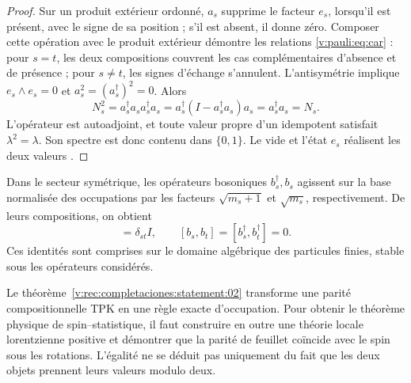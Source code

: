 \begin{proof}
Sur un produit extérieur ordonné, \(a_s\) supprime le facteur \(e_s\), lorsqu’il est
présent, avec le signe de sa position ; s’il est absent, il donne zéro. Composer
cette opération avec le produit extérieur démontre les relations
\eqref{v:pauli:eq:car} : pour \(s=t\), les deux compositions couvrent les cas
complémentaires d’absence et de présence ; pour \(s\ne t\), les signes
d’échange s’annulent. L’antisymétrie implique
\(e_s\wedge e_s=0\) et
\(a_s^2=(a_s^\dagger)^2=0\). Alors
\begin{equation}
 N_s^2=a_s^\dagger a_s a_s^\dagger a_s
 =a_s^\dagger(I-a_s^\dagger a_s)a_s
 =a_s^\dagger a_s=N_s.
 \label{v:pauli:eq:prueba-idempotencia}
\end{equation}
L’opérateur est autoadjoint, et toute valeur propre d’un idempotent satisfait
\(\lambda^2=\lambda\). Son spectre est donc contenu dans
\(\{0,1\}\). Le vide et l’état \(e_s\) réalisent les deux valeurs
\cite{Pauli1925,Dirac1926}.
\end{proof}

Dans le secteur symétrique, les opérateurs bosoniques \(b_s^\dagger,b_s\)
agissent sur la base normalisée des occupations par les facteurs
\(\sqrt{m_s+1}\) et \(\sqrt{m_s}\), respectivement. De leurs compositions,
on obtient
\begin{equation}
 [b_s,b_t^\dagger]=\delta_{st}I,
 \qquad [b_s,b_t]=[b_s^\dagger,b_t^\dagger]=0.
 \label{v:pauli:eq:ccr}
\end{equation}
Ces identités sont comprises sur le domaine algébrique des particules
finies, stable sous les opérateurs considérés.

Le théorème~\ref{v:rec:completaciones:statement:02} transforme une parité compositionnelle TPK en une règle exacte
d’occupation. Pour obtenir le théorème physique de spin--statistique, il faut
construire en outre une théorie locale lorentzienne positive et démontrer que la
parité de feuillet coïncide avec le spin sous les rotations. L’égalité ne se
déduit pas uniquement du fait que les deux objets prennent leurs valeurs modulo deux.
